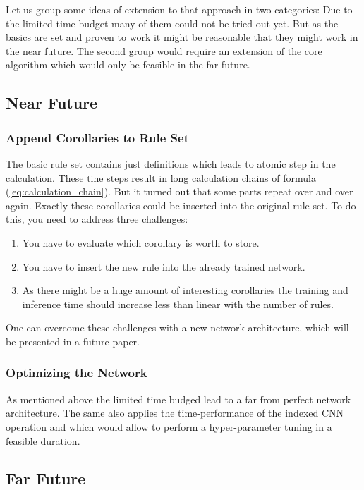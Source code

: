 \documentclass{scrartcl}
\theoremstyle{definition}
\begin{document}
Let us group some ideas of extension to that approach in two categories:
Due to the limited time budget many of them could not be tried out yet.
But as the basics are set and proven to work it might be reasonable that they might work in the near future.
The second group would require an extension of the core algorithm which would only be feasible in the far future.

\subsection{Near Future}

\subsubsection{Append Corollaries to Rule Set}

The basic rule set contains just definitions which leads to atomic step in the calculation.
These tine steps result in long calculation chains of formula (\ref{eq:calculation_chain}).
But it turned out that some parts repeat over and over again.
Exactly these corollaries could be inserted into the original rule set.
To do this, you need to address three challenges:

\begin{enumerate}[label=(\roman*)]
	\item You have to evaluate which corollary is worth to store.
	\item You have to insert the new rule into the already trained network.
	\item As there might be a huge amount of interesting corollaries the training and inference time should increase less than linear with the number of rules.
\end{enumerate}

One can overcome these challenges with a new network architecture, which will be presented in a future paper.

\subsubsection{Optimizing the Network}

As mentioned above the limited time budged lead to a far from perfect network architecture.
The same also applies the time-performance of the indexed CNN operation and which would allow to perform a hyper-parameter tuning in a feasible duration. 


\subsection{Far Future}
\end{document}
